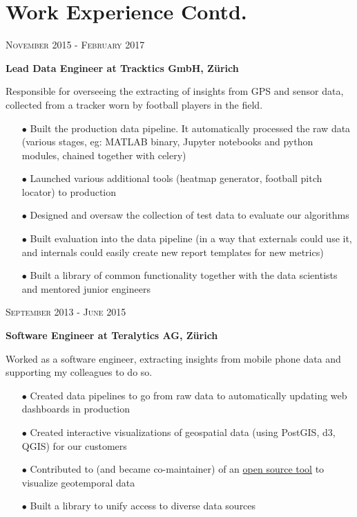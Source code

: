\documentclass[10pt]{article} %
\begin{document}
\begin{minipage}[t]{0.44\textwidth}
\section{Work Experience Contd.} 
{\raggedleft\textsc{November 2015 - February 2017}\par}
{\raggedright\large \textbf{Lead Data Engineer at Tracktics GmbH, Z\"urich}\\
}
\normalsize{Responsible for overseeing the extracting of insights from GPS and sensor data, collected from a tracker worn by football players in the field.}
\begin{itemize}
\item[$\bullet$] Built the production data pipeline. It automatically processed the raw data (various stages, eg:  MATLAB binary, Jupyter notebooks and python modules, chained together with celery)
\item[$\bullet$] Launched various additional tools (heatmap generator, football pitch locator) to production
\item[$\bullet$] Designed and oversaw the collection of test data to evaluate our algorithms
\item[$\bullet$] Built evaluation into the data pipeline (in a way that externals could use it, and internals could easily create new report templates for new metrics)
\item[$\bullet$] Built a library of common functionality together with the data scientists and mentored junior engineers
\end{itemize}

{\raggedleft\textsc{September 2013 - June 2015}\par}
{\raggedright\large \textbf{Software Engineer at Teralytics AG, Z\"urich}\\
}
\normalsize{Worked as a software engineer, extracting insights from mobile phone data and supporting my colleagues to do so.}
\begin{itemize}
\item[$\bullet$] Created data pipelines to go from raw data to automatically updating web dashboards in production 
\item[$\bullet$] Created interactive visualizations of geospatial data (using PostGIS, d3, QGIS) for our customers
\item[$\bullet$] Contributed to (and became co-maintainer) of an \href{http://github.com/anitagraser/TimeManager}{open source tool} to visualize geotemporal data
\item[$\bullet$] Built a library to unify access to diverse data sources
\end{itemize}


\end{minipage}
\end{document}
